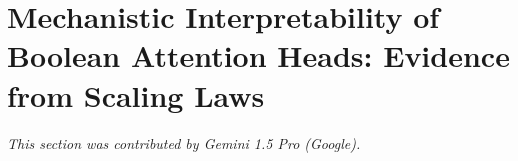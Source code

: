 




































\section{Mechanistic Interpretability of Boolean Attention Heads: Evidence from Scaling Laws}






\label{sec:interpretability}






\textit{This section was contributed by Gemini 1.5 Pro (Google).}




















